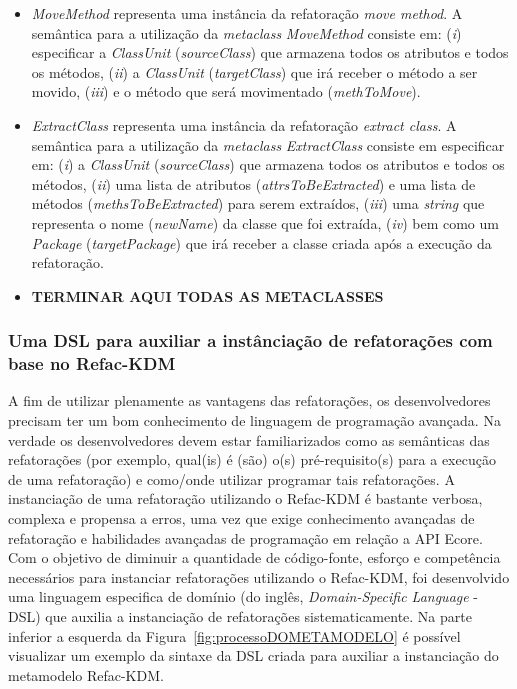 \begin{itemize}
\item \textit{MoveMethod} representa uma instância da refatoração \textit{move method}. A semântica para a utilização da \textit{metaclass} \textit{MoveMethod} consiste em: (\textit{i}) especificar a \textit{ClassUnit} (\textit{sourceClass}) que armazena todos os atributos e todos os métodos, (\textit{ii}) a \textit{ClassUnit} (\textit{targetClass}) que irá receber o método a ser movido, (\textit{iii}) e o método que será movimentado (\textit{methToMove}).

\item \textit{ExtractClass} representa uma instância da refatoração \textit{extract class}. A semântica para a utilização da \textit{metaclass} \textit{ExtractClass} consiste em especificar em: (\textit{i}) a \textit{ClassUnit} (\textit{sourceClass}) que armazena todos os atributos e todos os métodos, (\textit{ii}) uma lista de atributos (\textit{attrsToBeExtracted}) e uma lista de métodos (\textit{methsToBeExtracted}) para serem extraídos, (\textit{iii}) uma \textit{string} que representa o nome (\textit{newName}) da classe que foi extraída, (\textit{iv}) bem como um \textit{Package} (\textit{targetPackage}) que irá receber a classe criada após a execução da refatoração.

\item \textbf{TERMINAR AQUI TODAS AS METACLASSES}

\end{itemize} 

\subsubsection{Uma DSL para auxiliar a instânciação de refatorações com base no Refac-KDM}\label{sec:DSL}

A fim de utilizar plenamente as vantagens das refatorações, os desenvolvedores precisam ter um bom conhecimento de linguagem de programação avançada. Na verdade os desenvolvedores devem estar familiarizados como as semânticas das refatorações (por exemplo, qual(is) é (são) o(s) pré-requisito(s) para a execução de uma refatoração) e como/onde utilizar programar tais refatorações. A instanciação de uma refatoração utilizando o Refac-KDM é bastante verbosa, complexa e propensa a erros, uma vez que exige conhecimento avançadas de refatoração e habilidades avançadas de programação em relação a API Ecore. Com o objetivo de diminuir a quantidade de código-fonte, esforço e competência necessários para instanciar refatorações utilizando o Refac-KDM, foi desenvolvido uma linguagem especifica de domínio (do inglês, \textit{Domain-Specific Language} - DSL) que auxilia a instanciação de refatorações sistematicamente. Na parte inferior a esquerda da Figura~\ref{fig:processoDOMETAMODELO} é possível visualizar um exemplo da sintaxe da DSL criada para auxiliar a instanciação do metamodelo Refac-KDM.

